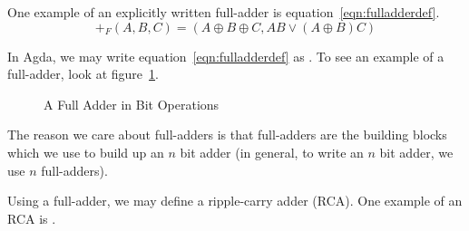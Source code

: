 \documentclass[14pt]{extarticle}  %
\theoremstyle{plain}
\theoremstyle{definition}
\theoremstyle{remark}
\begin{document}
One example of an explicitly written full-adder is equation~\ref{eqn:fulladderdef}.
\begin{equation}\label{eqn:fulladderdef}
  +_{F}(A,B,C) = (A \oplus B \oplus C , AB \lor (A \oplus B)C )
\end{equation}


In Agda, we may write equation~\ref{eqn:fulladderdef} as  .
To see an example of a full-adder, look at figure~\ref{fig:fulladder}.
 \begin{figure}
   \centering
   \caption{A Full Adder in Bit Operations}
   \label{fig:fulladder}
\end{figure}



The reason we care about full-adders is that full-adders are the building blocks which we use to build up an $n$ bit adder (in general, to write an $n$ bit adder, we use $n$ full-adders).

Using a full-adder, we may define a ripple-carry adder (RCA). One example of an RCA is .
\end{document}
